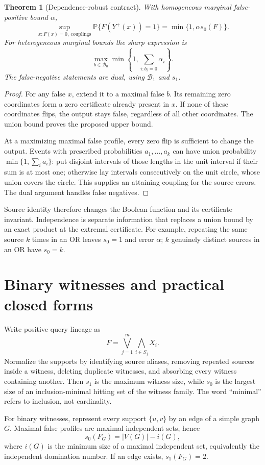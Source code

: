 \documentclass[11pt]{article}
\newtheorem{theorem}{Theorem}
\newcommand{\Prb}{\mathbb P}
\newcommand{\Bzero}{\mathcal B_0}
\newcommand{\Bone}{\mathcal B_1}
\begin{document}
\begin{theorem}[Dependence-robust contract]
With homogeneous marginal false-positive bound $\alpha$,
\[
 \sup_{x:F(x)=0,\ \text{couplings}}
 \Prb\{F(Y^+(x))=1\}
 =\min\{1,\alpha s_0(F)\}.
\]
For heterogeneous marginal bounds the sharp expression is
\[
 \max_{b\in\Bzero}
 \min\left\{1,\sum_{i:b_i=0}\alpha_i\right\}.
\]
The false-negative statements are dual, using $\Bone$ and $s_1$.
\end{theorem}

\begin{proof}
For any false $x$, extend it to a maximal false $b$. Its remaining zero
coordinates form a zero certificate already present in $x$. If none of
these coordinates flips, the output stays false, regardless of all other
coordinates. The union bound proves the proposed upper bound.

At a maximizing maximal false profile, every zero flip is sufficient to
change the output. Events with prescribed probabilities $a_1,\ldots,a_k$
can have union probability $\min\{1,\sum_i a_i\}$: put disjoint intervals
of those lengths in the unit interval if their sum is at most one; otherwise
lay intervals consecutively on the unit circle, whose union covers the
circle. This supplies an attaining coupling for the source errors. The
dual argument handles false negatives.
\end{proof}

Source identity therefore changes the Boolean function and its certificate
invariant. Independence is separate information that replaces a union bound
by an exact product at the extremal certificate. For example, repeating the
same source $k$ times in an OR leaves $s_0=1$ and error $\alpha$;
$k$ genuinely distinct sources in an OR have $s_0=k$.

\section{Binary witnesses and practical closed forms}

Write positive query lineage as
\[
 F=\bigvee_{j=1}^m\bigwedge_{i\in S_j}X_i.
\]
Normalize the supports by identifying source aliases, removing repeated
sources inside a witness, deleting duplicate witnesses, and absorbing every
witness containing another. Then $s_1$ is the maximum witness size, while
$s_0$ is the largest size of an inclusion-minimal hitting set of the
witness family. The word ``minimal'' refers to inclusion, not cardinality.

For binary witnesses, represent every support $\{u,v\}$ by an edge of a
simple graph $G$. Maximal false profiles are maximal independent sets, hence
\begin{equation}
 s_0(F_G)=|V(G)|-i(G),\label{eq:independent-domination}
\end{equation}
where $i(G)$ is the minimum size of a maximal independent set, equivalently
the independent domination number. If an edge exists, $s_1(F_G)=2$.
\end{document}
